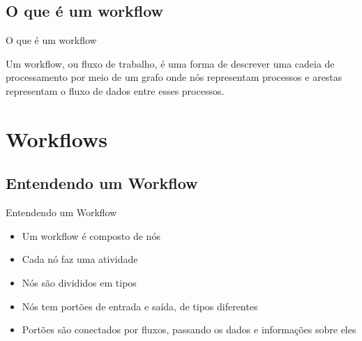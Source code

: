 \documentclass{beamer}
\begin{document}
\subsection{O que é um workflow}
\begin{frame}{O que é um workflow}
    \begin{outline}
        Um workflow, ou fluxo de trabalho, é uma forma de descrever uma cadeia de processamento por meio de um grafo onde nós representam processos e arestas representam o fluxo de dados entre esses processos.
        \vfill
        
    \end{outline}
\end{frame}


\section{Workflows}

\subsection{Entendendo um Workflow}
\begin{frame}{Entendendo um Workflow}
    \begin{itemize}
        \item Um workflow é composto de nós
        \item Cada nó faz uma atividade
        \item Nós são divididos em tipos
        \item Nós tem portões de entrada e saída, de tipos diferentes
        \item Portões são conectados por fluxos, passando os dados e informações sobre eles
    \end{itemize}
    \vfill
    
\end{frame} 
\end{document}
